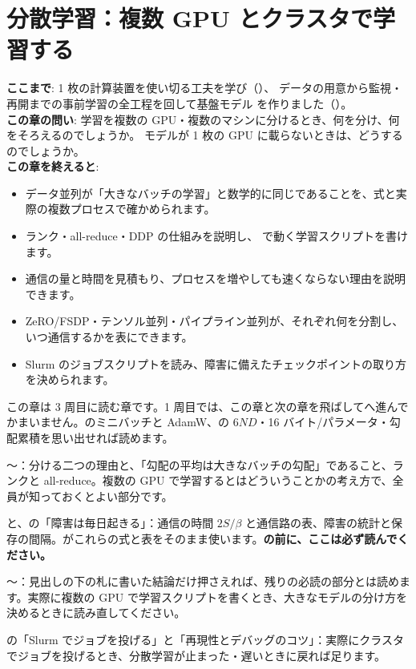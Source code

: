\chapter{分散学習：複数 GPU とクラスタで学習する}\label{ch:distributed}
\begin{chapterlead}
\textbf{ここまで}: 1 枚の計算装置を使い切る工夫を学び（）、
データの用意から監視・再開までの事前学習の全工程を回して基盤モデル  を作りました（）。\\[1mm]
\textbf{この章の問い}: 学習を複数の GPU・複数のマシンに分けるとき、何を分け、何をそろえるのでしょうか。
モデルが 1 枚の GPU に載らないときは、どうするのでしょうか。\\[1mm]
\textbf{この章を終えると}:
\begin{itemize}
\item データ並列が「大きなバッチの学習」と数学的に同じであることを、式と実際の複数プロセスで確かめられます。
\item ランク・all-reduce・DDP の仕組みを説明し、 で動く学習スクリプトを書けます。
\item 通信の量と時間を見積もり、プロセスを増やしても速くならない理由を説明できます。
\item ZeRO/FSDP・テンソル並列・パイプライン並列が、それぞれ何を分割し、いつ通信するかを表にできます。
\item Slurm のジョブスクリプトを読み、障害に備えたチェックポイントの取り方を決められます。
\end{itemize}
\end{chapterlead}

\begin{readingguide}
\item[\rgpre] この章は 3 周目に読む章です。1 周目では、この章と次の章を飛ばしてへ進んでかまいません。のミニバッチと AdamW、の $6ND$・16 バイト/パラメータ・勾配累積を思い出せれば読めます。
\item[\rgmust] 〜：分ける二つの理由と、「勾配の平均は大きなバッチの勾配」であること、ランクと all-reduce。複数の GPU で学習するとはどういうことかの考え方で、全員が知っておくとよい部分です。
\item[\rgmust] と、の「障害は毎日起きる」：通信の時間 $2S/\beta$ と通信路の表、障害の統計と保存の間隔。がこれらの式と表をそのまま使います。\textbf{の前に、ここは必ず読んでください。}
\item[\rgskim] 〜：見出しの下の札に書いた結論だけ押さえれば、残りの必読の部分とは読めます。実際に複数の GPU で学習スクリプトを書くとき、大きなモデルの分け方を決めるときに読み直してください。
\item[\rglater] の「Slurm でジョブを投げる」と「再現性とデバッグのコツ」：実際にクラスタでジョブを投げるとき、分散学習が止まった・遅いときに戻れば足ります。
\end{readingguide}

